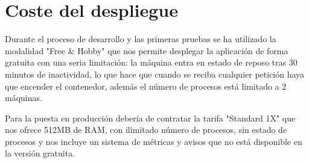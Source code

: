 \section{Coste del despliegue}
\label{sec:desp}

Durante el proceso de desarrollo y las primeras pruebas se ha utilizado la modalidad "Free & Hobby" que nos permite desplegar la aplicación de forma gratuita con una seria limitación: la máquina entra en estado de reposo tras 30 minutos de inactividad, lo que hace que cuando se reciba cualquier petición haya que encender el contenedor, además el número de procesos está limitado a 2 máquinas.

Para la puesta en producción debería de contratar la tarifa "Standard 1X" que nos ofrece 512MB de RAM, con ilimitado número de procesos, sin estado de procesos y nos incluye un sistema de métricas y avisos que no está disponible en la versión gratuita.

